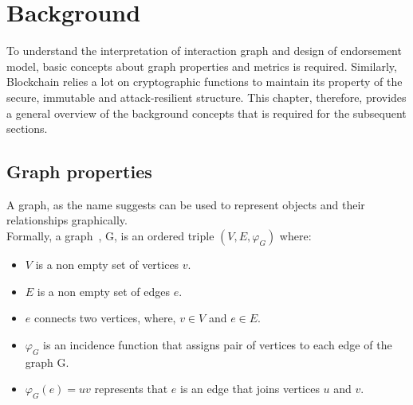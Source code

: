 \chapter{Background} \label{ch:background}
To understand the interpretation of interaction graph and design of endorsement
model, basic concepts about graph properties and metrics is required.
Similarly, Blockchain relies a lot on cryptographic functions to maintain its
property of the secure, immutable and attack-resilient structure. This chapter,
therefore, provides a general overview of the background concepts that is
required for the subsequent sections. 

\section{Graph properties}
A graph, as the name suggests can be used to represent objects and their
relationships graphically. \\
Formally, a graph~\cite{bondy1976graph}, G, is an ordered triple
\displaystyle${(V,E,\varphi _G)}$ where: 
\begin{itemize}
	\item $V$ is a non empty set of vertices $v$.
	\item $E$ is a non empty set of edges $e$.
	\item $e$ connects two vertices, where, $v \in V$ and $e \in E$.  
	\item $\varphi _G$ is an incidence function that assigns pair of vertices
		to each edge of the graph G. 
	\item $\varphi _G(e) = uv$ represents that $e$ is an edge that joins vertices $u$ and $v$.  
\end{itemize}
